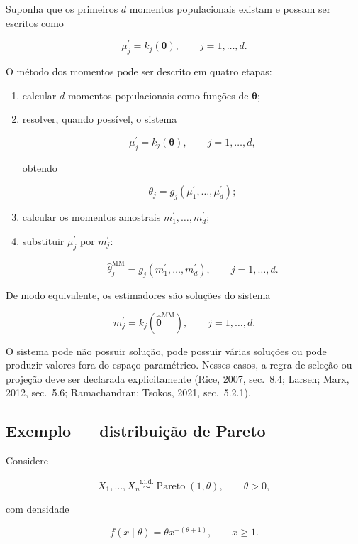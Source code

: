 \documentclass[
  letterpaper,
  DIV=11,
  numbers=noendperiod]{scrreprt}
\begin{document}
Suponha que os primeiros \(d\) momentos populacionais existam e possam
ser escritos como

\[\mu_j^{\prime}=k_j(\boldsymbol\theta),
\qquad j=1,\ldots,d.\]

O método dos momentos pode ser descrito em quatro etapas:

\begin{enumerate}
\def\labelenumi{\arabic{enumi}.}
\item
  calcular \(d\) momentos populacionais como funções de
  \(\boldsymbol\theta\);
\item
  resolver, quando possível, o sistema

  \[\mu_j^{\prime}=k_j(\boldsymbol\theta),
  \qquad j=1,\ldots,d,\]

  obtendo

  \[\theta_j=g_j(\mu_1^{\prime},\ldots,\mu_d^{\prime});\]
\item
  calcular os momentos amostrais \(m_1^{\prime},\ldots,m_d^{\prime}\);
\item
  substituir \(\mu_j^{\prime}\) por \(m_j^{\prime}\):

  \[\widehat\theta_j^{\mathrm{MM}}
  =g_j(m_1^{\prime},\ldots,m_d^{\prime}),
  \qquad j=1,\ldots,d.\]
\end{enumerate}

De modo equivalente, os estimadores são soluções do sistema

\[m_j^{\prime}=k_j(\widehat{\boldsymbol\theta}^{\mathrm{MM}}),
\qquad j=1,\ldots,d.\]

O sistema pode não possuir solução, pode possuir várias soluções ou pode
produzir valores fora do espaço paramétrico. Nesses casos, a regra de
seleção ou projeção deve ser declarada explicitamente (Rice, 2007,
sec.~8.4; Larsen; Marx, 2012, sec.~5.6; Ramachandran; Tsokos, 2021,
sec.~5.2.1).

\subsection*{Exemplo --- distribuição de
Pareto}\label{exemplo-distribuiuxe7uxe3o-de-pareto}

Considere

\[X_1,\ldots,X_n\overset{\mathrm{i.i.d.}}{\sim}\operatorname{Pareto}(1,\theta),
\qquad \theta>0,\]

com densidade

\[f(x\mid\theta)=\theta x^{-(\theta+1)},
\qquad x\geq1.\]
\end{document}
